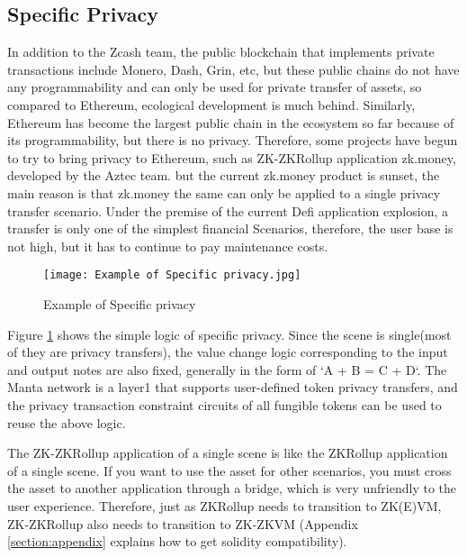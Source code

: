 \subsection{Specific Privacy}

In addition to the Zcash\cite{website:Zcash} team, the public blockchain that implements private transactions 
include Monero\cite{website:Monero}, Dash\cite{website:Dash}, Grin\cite{website:Grin}, etc, but these public chains do not have any 
programmability and can only be used for private transfer of assets, so compared to 
Ethereum\cite{website:Ethereum}, ecological development is much behind. Similarly, Ethereum\cite{website:Ethereum} has become 
the largest public chain in the ecosystem so far because of its programmability, 
but there is no privacy. Therefore, some projects have begun to try to bring privacy to 
Ethereum\cite{website:Ethereum}, such as ZK-ZKRollup application zk.money\cite{website:zk.money}, developed by the Aztec\cite{website:Aztec} team. 
but the current zk.money\cite{website:zk.money} product is sunset, the main reason is that zk.money\cite{website:zk.money}
the same can only be applied to a single privacy transfer scenario. Under the premise 
of the current Defi application explosion, a transfer is only one of the simplest 
financial Scenarios, therefore, the user base is not high, but it has to continue 
to pay maintenance costs.
\begin{figure}[!ht]
    \centering
    \texttt{[image: Example of Specific privacy.jpg]}
    \caption{Example of Specific privacy}
    \label{fig:Example of Specific privacy}
\end{figure}

Figure \ref{fig:Example of Specific privacy} shows the simple logic of specific privacy. Since the scene is single(most of 
they are privacy transfers), the value change logic corresponding to the input and output 
notes are also fixed, generally in the form of `A + B = C + D`. The Manta network\cite{website:Manta-network} is a 
layer1 that supports user-defined token privacy transfers, and the privacy transaction 
constraint circuits of all fungible tokens can be used to reuse the above logic.

The ZK-ZKRollup application of a single scene is like the ZKRollup application of a 
single scene. If you want to use the asset for 
other scenarios, you must cross the asset to another application through a bridge, 
which is very unfriendly to the user experience. Therefore, just as ZKRollup needs to 
transition to ZK(E)VM, ZK-ZKRollup also needs to transition to ZK-ZKVM (Appendix \ref{section:appendix} explains 
how to get solidity compatibility).